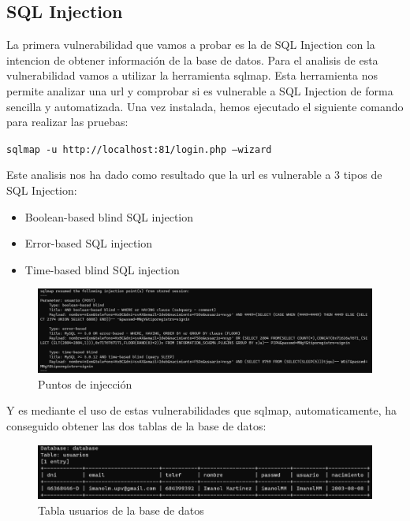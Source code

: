 \documentclass{report}
\begin{document}
            \subsection{SQL Injection}
                La primera vulnerabilidad que vamos a probar es la de SQL Injection con la intencion de obtener información de la base de datos.
                Para el analisis de esta vulnerabilidad vamos a utilizar la herramienta sqlmap. 
                Esta herramienta nos permite analizar una url y comprobar si es vulnerable a SQL Injection de forma sencilla y automatizada.
                Una vez instalada, hemos ejecutado el siguiente comando para realizar las pruebas:\\
                \begin{center}
                    \texttt{sqlmap -u http://localhost:81/login.php --wizard}
                \end{center}
                Este analisis nos ha dado como resultado que la url es vulnerable a 3 tipos de SQL Injection:
                \begin{itemize}
                    \item Boolean-based blind SQL injection
                    \item Error-based SQL injection
                    \item Time-based blind SQL injection
                \end{itemize}
                \begin{figure}[H]
                    \centering
                    \includegraphics[width=1\textwidth]{./img/vulnerabilidades/2.3/1.1.png}
                    \caption{Puntos de injección}
                \end{figure}
                \clearpage
                Y es mediante el uso de estas vulnerabilidades que sqlmap, automaticamente, ha conseguido obtener las dos tablas de la base de datos:
                \begin{figure}[H]
                    \centering
                    \includegraphics[width=1\textwidth]{./img/vulnerabilidades/2.3/1.2.png}
                    \caption{Tabla usuarios de la base de datos}
                \end{figure}
\end{document}
